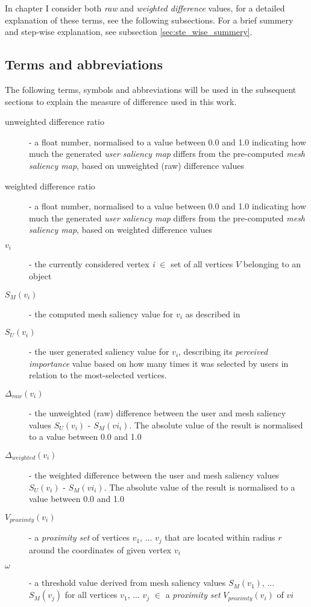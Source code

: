 In chapter %
I consider both \textit{raw} and \textit{weighted difference} values, for a detailed explanation of these terms, see the following subsections. For a brief summery and step-wise explanation, see subsection \ref{sec:ste_wise_summery}.

		\subsection{Terms and abbreviations}
		\label{sec:concept_terms_and_abbreviations}
The following terms, symbols and abbreviations will be used in the subsequent sections to explain the measure of difference used in this work.

\begin{description}
	\item[unweighted difference ratio] - a float number, normalised to a value between 0.0 and 1.0 indicating how much the generated \textit{user saliency map} differs from the pre-computed \textit{mesh saliency map}, based on unweighted (raw) difference values
	\item[weighted difference ratio] - a float number, normalised to a value between 0.0 and 1.0 indicating how much the generated \textit{user saliency map} differs from the pre-computed \textit{mesh saliency map}, based on weighted difference values
	\item[$v_i$] - the currently considered vertex \textit{i} $\in$ set of all vertices $V$ belonging to an object
	\item[$S_{M}(v_i)$] - the computed mesh saliency value for $v_i$ as described in \cite{lee2005mesh}
	\item[$S_{U}(v_i)$] - the user generated saliency value for $v_i$, describing its \textit{perceived importance} value based on how many times it was selected by users in relation to the most-selected vertices.
	\item[$\Delta_{raw}(v_i)$] - the unweighted (raw) difference between the user and mesh saliency values $S_{U}(v_i)$ - $S_{M}(vi_i)$. The absolute value of the result is normalised to a value between 0.0 and 1.0
	\item[$\Delta_{weighted}(v_i)$] - the weighted difference between the user and mesh saliency values $S_{U}(v_i)$ - $S_{M}(vi_i)$. The absolute value of the result is normalised to a value between 0.0 and 1.0
	\item[$V_{proximty}(v_i)$] - a \textit{proximity set} of vertices $v_1$, ... $v_j$ that are located within radius $r$ around the coordinates of given vertex $v_i$
	\item[$\omega$] - a threshold value derived from mesh saliency values $S_{M}(v_1)$, ... $S_{M}(v_j)$ for all vertices $v_1$, ... $v_j$ $\in$ a \textit{proximity set} $V_{proximty}(v_i)$ of $vi$
\end{description}

